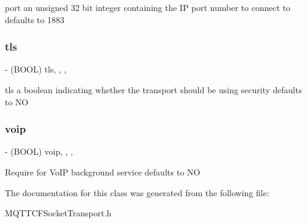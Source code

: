 port an unsigned 32 bit integer containing the IP port number to connect to defaults to 1883 \mbox{\label{interface_m_q_t_t_c_f_socket_transport_ac0c5a60636d7561abf1d20caddf6ea96}} 
\subsubsection{\texorpdfstring{tls}{tls}}
{\footnotesize\ttfamily -\/ (B\+O\+OL) tls\hspace{0.3cm}{\ttfamily [read]}, {\ttfamily [write]}, {\ttfamily [nonatomic]}, {\ttfamily [assign]}}

tls a boolean indicating whether the transport should be using security defaults to NO \mbox{\label{interface_m_q_t_t_c_f_socket_transport_a93ad817080f804937ad2bfd7d4db2b8b}} 
\subsubsection{\texorpdfstring{voip}{voip}}
{\footnotesize\ttfamily -\/ (B\+O\+OL) voip\hspace{0.3cm}{\ttfamily [read]}, {\ttfamily [write]}, {\ttfamily [nonatomic]}, {\ttfamily [assign]}}

Require for Vo\+IP background service defaults to NO 

The documentation for this class was generated from the following file\+:\begin{DoxyCompactItemize}
\item 
M\+Q\+T\+T\+C\+F\+Socket\+Transport.\+h\end{DoxyCompactItemize}
